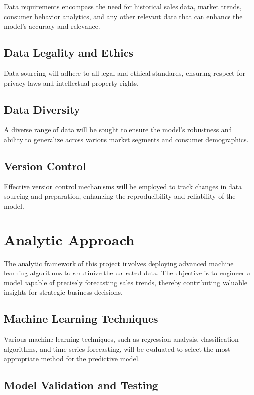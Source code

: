 \documentclass{article}
\begin{document}
Data requirements encompass the need for historical sales data, market trends, consumer behavior analytics, and any other relevant data that can enhance the model's accuracy and relevance.



\subsection{Data Legality and Ethics}

Data sourcing will adhere to all legal and ethical standards, ensuring respect for privacy laws and intellectual property rights.

\subsection{Data Diversity}

A diverse range of data will be sought to ensure the model's robustness and ability to generalize across various market segments and consumer demographics.

\subsection{Version Control}

Effective version control mechanisms will be employed to track changes in data sourcing and preparation, enhancing the reproducibility and reliability of the model.

\section{Analytic Approach}
The analytic framework of this project involves deploying advanced machine learning algorithms to scrutinize the collected data. The objective is to engineer a model capable of precisely forecasting sales trends, thereby contributing valuable insights for strategic business decisions.


\subsection{Machine Learning Techniques}

Various machine learning techniques, such as regression analysis, classification algorithms, and time-series forecasting, will be evaluated to select the most appropriate method for the predictive model.

\subsection{Model Validation and Testing}
\end{document}
